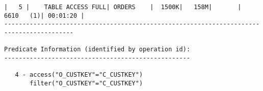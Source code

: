 \documentclass[11pt,a4paper,parskip=half]{scrartcl}
\begin{document}
\begin{lstlisting}
|   5 |    TABLE ACCESS FULL| ORDERS    |  1500K|   158M|       |  6610   (1)| 00:01:20 |                                                                                                                                                                                                                    
-----------------------------------------------------------------------------------------                                                                                                                                                                                                                    
                                                                                                                                                                                                                                                                                                             
Predicate Information (identified by operation id):                                                                                                                                                                                                                                                          
---------------------------------------------------                                                                                                                                                                                                                                                          
                                                                                                                                                                                                                                                                                                             
   4 - access("O_CUSTKEY"="C_CUSTKEY")                                                                                                                                                                                                                                                                       
       filter("O_CUSTKEY"="C_CUSTKEY")                                                                                                                                                                                                                                                                       
\end{lstlisting}
\end{document}
